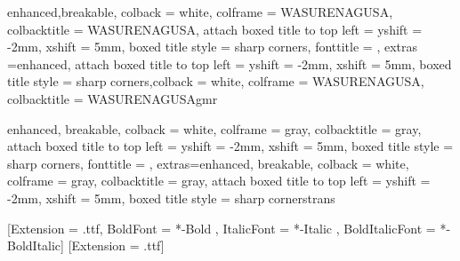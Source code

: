 \setlength{\glossglue}{5pt plus 2pt minus 1pt}
\setmainfont{FreeSerif}
\renewcommand\th{þ}
\noautomath
\makeatletter
\renewcommand\@makefntext[1]{%
    \setlength\parindent{1em}%
    \noindent
    \mbox{\textsuperscript{\@thefnmark}\,}{#1}}
\makeatother
\makeatletter
\newcommand{\dynscriptsize}{\check@mathfonts\fontsize{\sf@size}{\z@}\selectfont}
\makeatother
\newcommand\textunderset[2]{%
    \leavevmode
    \vtop{\offinterlineskip
        \halign{%
            \hfil##\hfil\cr %
            \strut#2\cr
            \noalign{\kern-.3ex}
            \dynscriptsize\strut#1\cr
        }%
    }%
}
\newcommand\textoverset[2]{%
    \leavevmode
    \vbox{\offinterlineskip
        \halign{%
            \hfil##\hfil\cr %
            \dynscriptsize\strut#1\cr
            \noalign{\kern-.3ex}
            \strut#2\cr
        }%
    }%
}

{enhanced,breakable,
    colback = white, colframe = WASURENAGUSA, colbacktitle = WASURENAGUSA,
    attach boxed title to top left = {yshift = -2mm, xshift = 5mm},
    boxed title style = {sharp corners},
    fonttitle = \sffamily, extras ={enhanced, attach boxed title to top left = {yshift = -2mm, xshift = 5mm},
            boxed title style = {sharp corners}},colback = white, colframe = WASURENAGUSA, colbacktitle = WASURENAGUSA}{gmr}

{enhanced, breakable,
    colback = white, colframe = gray, colbacktitle = gray,
    attach boxed title to top left = {yshift = -2mm, xshift = 5mm},
    boxed title style = {sharp corners},
    fonttitle = \sffamily, extras={enhanced, breakable,
            colback = white, colframe = gray, colbacktitle = gray,
            attach boxed title to top left = {yshift = -2mm, xshift = 5mm},
            boxed title style = {sharp corners}}}{trans}

[Extension = .ttf,
    BoldFont = *-Bold ,
    ItalicFont = *-Italic ,
    BoldItalicFont = *-BoldItalic]
[Extension = .ttf]

